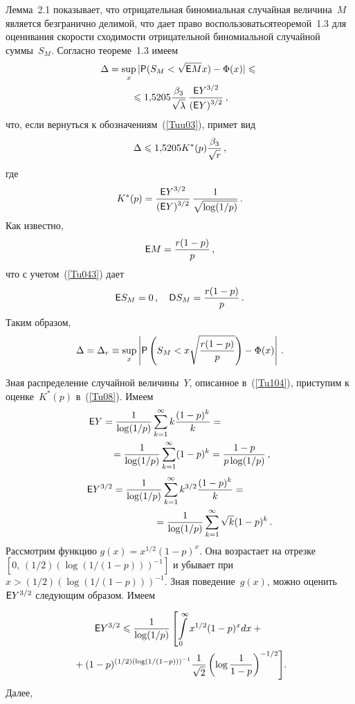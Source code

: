 \begin{multicols}{2}
Лемма~2.1 показывает, что отрицательная бино\-миальная случайная
величина~$M$ является безгранично делимой, что дает право
воспользоваться\linebreak теоремой~1.3 для оценивания скорости схо\-ди\-мости
отрицательной биномиальной случайной суммы~$S_M$. Согласно теореме~1.3 имеем
\begin{multline*}
\Delta = \sup\limits_{x}|{\sf P}(S_{M}<\sqrt{{\sf E} M}x)-\Phi(x)| \leqslant{}\\
{}\leqslant
1{,}5205 \displaystyle\frac{\displaystyle \beta_3\mathstrut}{\displaystyle \sqrt{\lambda}\mathstrut}\,\displaystyle\frac{\displaystyle {\sf E}
Y^{3/2}\mathstrut}{\displaystyle ({\sf E} Y)^{3/2}\mathstrut}\,,
\end{multline*}
что, если вернуться к обозначениям~(\ref{Tuu03}), примет вид
\begin{equation}
 \Delta \leqslant 1{,}5205
K^*(p)\displaystyle\frac{\displaystyle \beta_3\mathstrut}{\displaystyle \sqrt{r}\mathstrut}\,, \label{Tu08}
\end{equation}
где
\begin{equation}
K^*(p)=\displaystyle\frac{\displaystyle {\sf E} Y^{3/2}\mathstrut}{\displaystyle ({\sf E}
Y)^{3/2}\mathstrut}\,\displaystyle\frac{\displaystyle 1\mathstrut}{\displaystyle \sqrt{\log(1/p)}\mathstrut}\,.
\end{equation}
Как известно,
$$
{\sf E} M =  \displaystyle\frac{\displaystyle r(1-p)\mathstrut}{\displaystyle p\mathstrut}\,,
$$
что с учетом~(\ref{Tu043}) дает
$$
{\sf E} S_M =0\,,  \quad {\sf D} S_M = \displaystyle\frac{\displaystyle r(1-p)\mathstrut}{\displaystyle p\mathstrut}\,.
$$
Таким образом,
$$
\Delta  = \Delta_r \equiv \sup\limits_{x}\left|{\sf P}\left({
S}_{M}<x\sqrt{\displaystyle\frac{\displaystyle r(1-p)\mathstrut}{\displaystyle p\mathstrut}}\right)-\Phi(x)\right|\,.
$$

Зная распределение случайной величины~$Y$, описанное в~(\ref{Tu104}), 
приступим к оценке~$K^*(p)$ в~(\ref{Tu08}). Имеем
\begin{align*}
{\sf E} Y&=\displaystyle\frac{\displaystyle 1\mathstrut}{\displaystyle \log(1/p)\mathstrut}\sum\limits_{k=1}^\infty k\displaystyle\frac{\displaystyle (1-p)^k\mathstrut}{\displaystyle k\mathstrut}={}\\
&\hspace*{3mm}{}=
\displaystyle\frac{\displaystyle 1\mathstrut}{\displaystyle \log({1}/{p})\mathstrut}\sum\limits_{k=1}^\infty(1-p)^k=\displaystyle\frac{\displaystyle 1-p\mathstrut}{\displaystyle p\log({1}/{p})\mathstrut}\,,
\end{align*}
\begin{align*}
\e Y^{3/2}&=\fr{1}{\log({1}/{p})}\sum\limits_{k=1}^\infty k^{3/2} \fr{(1-p)^k}{k}={}\\
&\hspace*{15mm}{}=
\fr{1}{\log({1}/{p})}\sum\limits_{k=1}^\infty \sqrt{k}
(1-p)^k\,.
\end{align*}
Рассмотрим функцию $g(x) = x^{1/2}(1-p)^x.$ Она возрастает на
отрезке $\left[0,\, (1/2)(\log (1/(1-p)))^{-1}\right]$ и
убывает при $x > (1/2)\left(\log(1/(1-p))\right)^{-1}$. Зная
поведение~$g(x)$, можно оценить ${\sf E} Y^{3/2}$ следующим образом.
Имеем

\noindent
\begin{multline*}
{\sf E} Y^{3/2} \leqslant
\displaystyle\frac{\displaystyle 1\mathstrut}{\displaystyle \log({1}/{p})\mathstrut}\left[\int\limits_{0}^\infty
x^{{1}/{2}}(1-p)^x dx +{}\right.\\
\left.{}+
(1-p)^{(1/2)\left(\log(1/({1-p}))\right)^{-1}}
\displaystyle\frac{\displaystyle 1\mathstrut}{\displaystyle \sqrt{2}\mathstrut}\left(\log\frac1{1-p}\right)^{-1/2}\right]\!.
\end{multline*}
Далее,


\end{multicols}
